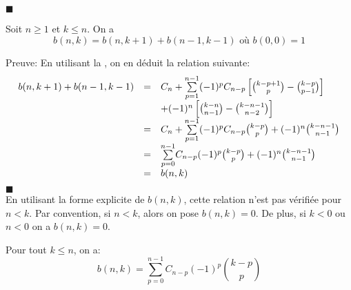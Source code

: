 $\blacksquare$\vspace{5pt}
\begin{proposition} \label{bnkRec}
	Soit $ n\geq 1$ et $k\leq n$. On a
	\begin{equation} \label{eq:bnkRec}
		b(n,k)=b(n,k+1)+b(n-1,k-1) \text{ où } b(0,0)=1 %
	\end{equation}
\end{proposition}
Preuve:
En utilisant la , on en déduit la relation suivante:\\
\[
	\begin{array}{r c l}
		b(n,k+1)+ b(n-1,k-1) & = & C_{n}+\underset{p=1}{\overset{n-1}{\sum}}(-1)^pC_{n-p}\left[ \binom{k-p+1}{p}-\binom{k-p}{p-1} \right]\\
		&\text{ }&+(-1)^n\left[ \binom{k-n}{n-1}-\binom{k-n-1}{n-2} \right] \\
		                     & = & C_{n}+\underset{p=1}{\overset{n-1}{\sum}}(-1)^pC_{n-p}\binom{k-p}{p}+(-1)^n\binom{k-n-1}{n-1}                                                                   \\
		                     & = & \underset{p=0}{\overset{n-1}{\sum}}C_{n-p}(-1)^p\binom{k-p}{p}+(-1)^n\binom{k-n-1}{n-1}                                                                         \\
		                     & = & b(n,k)
	\end{array}
\]
$\blacksquare$\vspace{10pt}\\
En utilisant la forme explicite de $b(n,k)$, cette relation n'est pas vérifiée pour $n<k$.
Par convention, si $n<k$, alors on pose $b(n,k)=0$.
De plus, si $k<0$ ou $n<0$ on a $b(n,k)=0$.
\begin{corollaire}
	Pour tout $k \leq n$, on a:
	$$ b(n,k)=\underset{p=0}{\overset{n-1}{\sum}}C_{n-p}(-1)^p\binom{k-p}{p} $$
\end{corollaire}

